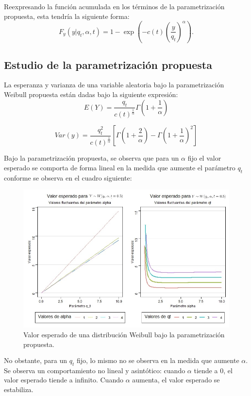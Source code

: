 \documentclass{report}
\begin{document}
Reexpresando la función acumulada en los términos de la parametrización propuesta, esta tendría la siguiente forma:
\begin{equation} \label{eq:1}
F_{y}\left(y| q_{t},\alpha,t \right)=1-\exp\left( -c(t)\left( \frac{y}{q_{t}} \right)^{\alpha} \right).
\end{equation}
\subsection{Estudio de la parametrización propuesta}

La esperanza y varianza de una variable aleatoria bajo la parametrización Weibull propuesta están dadas bajo la siguiente expresión:
\begin{equation}
E(Y)=\frac{q_{t}}{c(t)^{\frac{1}{\alpha}}}\Gamma\left( 1+\frac{1}{\alpha} \right)
\end{equation}

\begin{equation}
Var(y)=\frac{q_{t}^{2}}{c(t)^{\frac{1}{\alpha}}}\left[ \Gamma\left( 1+\frac{2}{\alpha}\right)-\Gamma\left( 1+\frac{1}{\alpha} \right)^{2} \right]
\end{equation}

Bajo la parametrización propuesta, se observa que para un $\alpha$ fijo el valor esperado se comporta de forma lineal en la medida que aumente el parámetro $q_{t}$ conforme se observa en el cuadro siguiente:

\begin{figure}[H]
	\includegraphics[width=\textwidth]{esperado}
	\caption{Valor esperado de una distribución Weibull bajo la parametrización propuesta.}
\end{figure}
\noindent No obstante, para un $q_{t}$ fijo, lo mismo no se observa en la medida que aumente $\alpha$. Se observa un comportamiento no lineal y asintótico: cuando $\alpha$ tiende a 0, el valor esperado tiende a infinito. Cuando $\alpha$ aumenta, el valor esperado se estabiliza.
\end{document}
